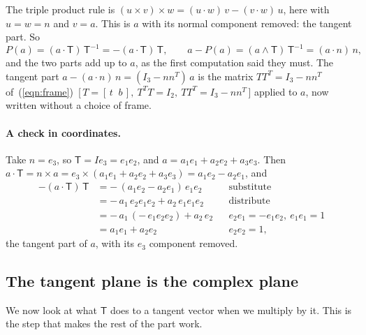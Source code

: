 The triple product rule is $(u\times v)\times w = (u\cdot w)\,v - (v\cdot w)\,u$, here with $u = w = n$ and $v = a$. This is $a$ with its normal component removed: the tangent part. So
\begin{equation}
\label{eqn:ga_projection}
P(a) = (a \cdot \mathsf T)\, \mathsf T^{-1} = -(a \cdot \mathsf T)\, \mathsf T, \qquad a - P(a) = (a \wedge \mathsf T)\, \mathsf T^{-1} = (a \cdot n)\, n ,
\end{equation}
and the two parts add up to $a$, as the first computation said they must. The tangent part $a - (a\cdot n)\,n = (I_3 - nn^T)\,a$ is the matrix $T T^T = I_3 - n n^T$ of~(\ref{eqn:frame})~[\,$T = [\,t\;\;b\,],\ T^TT = I_2,\ TT^T = I_3 - nn^T$\,] applied to $a$, now written without a choice of frame.

\paragraph{A check in coordinates.} Take $n = e_3$, so $\mathsf T = I e_3 = e_1e_2$, and $a = a_1 e_1 + a_2 e_2 + a_3 e_3$. Then $a\cdot\mathsf T = n\times a = e_3\times(a_1e_1 + a_2e_2 + a_3e_3) = a_1 e_2 - a_2 e_1$, and
\begin{align*}
-(a\cdot\mathsf T)\,\mathsf T &= -\,(a_1 e_2 - a_2 e_1)\, e_1 e_2 && \text{substitute} \\
&= -\,a_1\, e_2 e_1 e_2 + a_2\, e_1 e_1 e_2 && \text{distribute} \\
&= -\,a_1\,(-\,e_1 e_2 e_2) + a_2\, e_2 && e_2e_1 = -e_1e_2,\ e_1e_1 = 1 \\
&= a_1 e_1 + a_2 e_2 && e_2e_2 = 1 ,
\end{align*}
the tangent part of $a$, with its $e_3$ component removed.

\subsection{The tangent plane is the complex plane}

We now look at what $\mathsf T$ does to a tangent vector when we multiply by it. This is the step that makes the rest of the part work.

